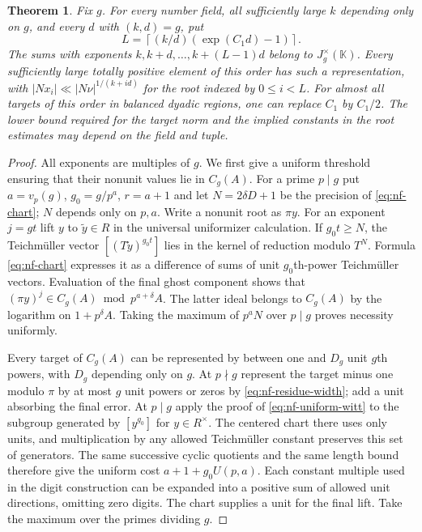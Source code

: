 \documentclass[11pt,letterpaper]{article}
\newtheorem{theorem}{Theorem}[section]
\theoremstyle{definition}
\numberwithin{equation}{section}
\begin{document}
\begin{theorem}\label{thm:fixed-gcd-mixed}
Fix $g$. For every number field, all sufficiently large $k$ depending
only on $g$, and every $d$
with $(k,d)=g$, put
\[
          L=\left\lceil (k/d)(\exp(C_1d)-1)\right\rceil .
\]
The sums with exponents $k,k+d,\ldots,k+(L-1)d$ belong to
$J_g^\times(\mathbb K)$. Every sufficiently large totally positive
element of this order has such a representation, with
$|Nx_i|\ll |N\nu|^{1/(k+id)}$ for the root indexed by $0\le i<L$.
For almost all targets of this order in balanced dyadic regions,
one can replace $C_1$ by $C_1/2$. The lower bound required for the target norm and the implied constants
in the root estimates may depend on the field and tuple.
\end{theorem}
\begin{proof}
All exponents are multiples of $g$. We first give a uniform
threshold ensuring that their nonunit values lie in $C_g(A)$.
For a prime $p\mid g$ put $a=v_p(g)$, $g_0=g/p^a$, $r=a+1$ and
let $N=2\delta D+1$ be the precision of \eqref{eq:nf-chart};
$N$ depends only on $p,a$. Write a nonunit root as $\pi y$.
For an exponent $j=gt$ lift $y$ to $\tilde y\in R$ in the
universal uniformizer calculation. If $g_0t\ge N$, the
Teichm\"uller vector $[(T\tilde y)^{g_0t}]$ lies in the kernel of
reduction modulo $T^N$. Formula \eqref{eq:nf-chart} expresses it
as a difference of sums of unit $g_0$th-power Teichm\"uller
vectors. Evaluation of the final ghost component shows that
$(\pi y)^j\in C_g(A)\bmod p^{a+\delta}A$. The latter ideal belongs to
$C_g(A)$ by the logarithm on $1+p^\delta A$. Taking the maximum
of $p^a N$ over $p\mid g$ proves necessity uniformly.

Every target of $C_g(A)$ can be represented by between one and
$D_g$ unit $g$th powers, with $D_g$ depending only on $g$.
At $p\nmid g$ represent the target minus one modulo $\pi$ by at
most $g$ unit powers or zeros by \eqref{eq:nf-residue-width}; add
a unit absorbing the final error. At $p\mid g$ apply the proof of
\eqref{eq:nf-uniform-witt} to the subgroup generated by
$[y^{g_0}]$ for $y\in R^\times$. The centered chart there uses
only units, and multiplication by any allowed Teichm\"uller constant
preserves this set of generators. The same successive cyclic
quotients and the same length bound therefore give the uniform
cost $a+1+g_0 U(p,a)$. Each constant multiple used in the digit
construction can be expanded into a positive sum of allowed unit
directions, omitting zero digits. The chart supplies a unit for
the final lift. Take the maximum over the primes dividing $g$.


\end{proof}
\end{document}
